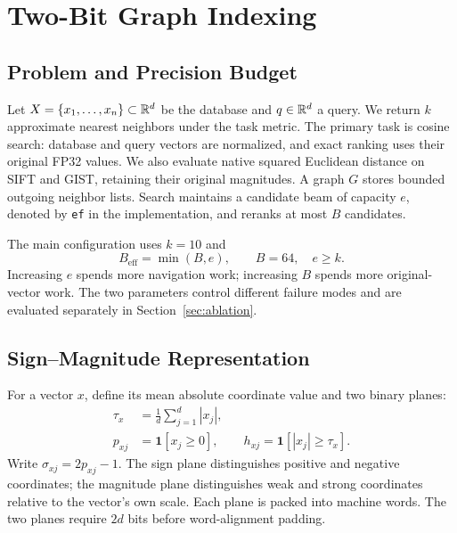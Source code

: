 \section{Two-Bit Graph Indexing}
\label{sec:design}

\subsection{Problem and Precision Budget}
Let $X=\{x_1,\ldots,x_n\}\subset\mathbb{R}^d$ be the database and $q\in\mathbb{R}^d$ a query. We return $k$ approximate nearest neighbors under the task metric. The primary task is cosine search: database and query vectors are normalized, and exact ranking uses their original FP32 values. We also evaluate native squared Euclidean distance on SIFT and GIST, retaining their original magnitudes. A graph $G$ stores bounded outgoing neighbor lists. Search maintains a candidate beam of capacity $e$, denoted by \texttt{ef} in the implementation, and reranks at most $B$ candidates.

The main configuration uses $k=10$ and
\begin{equation}
    B_{\mathrm{eff}}=\min(B,e),\qquad B=64,\quad e\ge k.
    \label{eq:budget}
\end{equation}
Increasing $e$ spends more navigation work; increasing $B$ spends more original-vector work. The two parameters control different failure modes and are evaluated separately in Section~\ref{sec:ablation}.

\subsection{Sign--Magnitude Representation}
For a vector $x$, define its mean absolute coordinate value and two binary planes:
\begin{equation}
\begin{split}
    \tau_x&=\frac{1}{d}\sum_{j=1}^d |x_j|,\\
    p_{xj}&=\mathbf{1}[x_j\ge0],\qquad
    h_{xj}=\mathbf{1}[|x_j|\ge\tau_x].
\end{split}
\label{eq:bits}
\end{equation}
Write $\sigma_{xj}=2p_{xj}-1$. The sign plane distinguishes positive and negative coordinates; the magnitude plane distinguishes weak and strong coordinates relative to the vector's own scale. Each plane is packed into machine words. The two planes require $2d$ bits before word-alignment padding.

